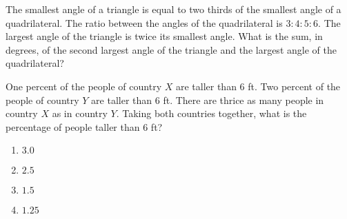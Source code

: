 \item The smallest angle of a triangle is equal to two thirds of the smallest angle of a quadrilateral. The ratio between the angles of the quadrilateral is $3:4:5:6$. The largest angle of the triangle is twice its smallest angle. What is the sum, in degrees, of the second largest angle of the triangle and the largest angle of the quadrilateral?
\hfill{}

\item One percent of the people of country $X$ are taller than $6$ ft. Two percent of the people of country $Y$ are taller than $6$ ft. There are thrice as many people in country $X$ as in country $Y$. Taking both countries together, what is the percentage of people taller than $6$ ft?
\hfill{}
\begin{enumerate}
\item $3.0$
\item $2.5$
\item $1.5$
\item $1.25$
\end{enumerate}

